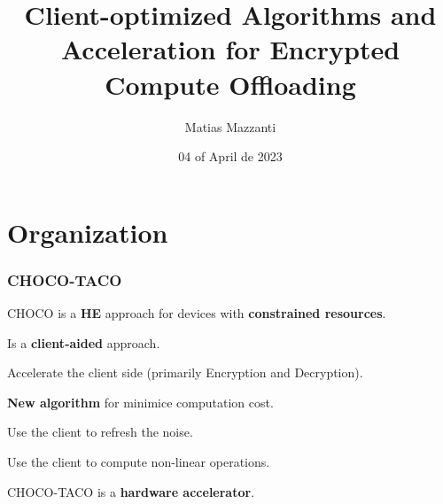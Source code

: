 \documentclass[10pt,handout]{beamer}
\title[CHOCO]{Client-optimized Algorithms and Acceleration for Encrypted Compute Offloading}
\author[Matias Mazzanti]{Matias Mazzanti}
\institute{}
\date{04 of April de 2023}
\begin{document}
\begin{frame}

\maketitle

\end{frame}


\section{Organization}
\begin{frame}
    \frametitle{CHOCO-TACO}

    CHOCO is a \textbf{HE} approach for devices with \textbf{constrained resources}.

    Is a \textbf{client-aided} approach.
\pause

    Accelerate the client side (primarily Encryption and Decryption).

    \textbf{New algorithm} for minimice computation cost.

\pause
    Use the client to refresh the noise.

    Use the client to compute non-linear operations.

    CHOCO-TACO is a \textbf{hardware accelerator}.
\end{frame}
\end{document}

